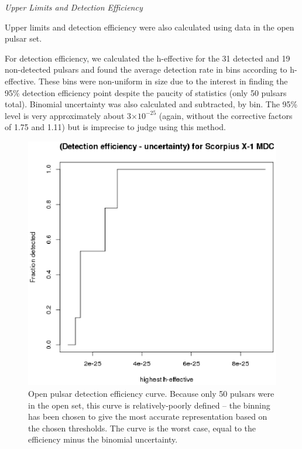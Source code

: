 \textit{Upper Limits and Detection Efficiency}

Upper limits and detection efficiency were also calculated using data in the open pulsar set.

For detection efficiency, we calculated the h-effective for the 31 detected and 19 non-detected pulsars and found the average detection rate in bins according to h-effective. These bins were non-uniform in size due to the interest in finding the 95\% detection efficiency point despite the paucity of statistics (only 50 pulsars total). Binomial uncertainty was also calculated and subtracted, by bin. The 95\% level is very approximately about 3$\times 10^{-25}$ (again, without the corrective factors of 1.75 and 1.11) but is imprecise to judge using this method.

\begin{figure}
\begin{center}
\includegraphics[width=0.3\paperwidth,height=0.2\paperheight]{detectionVsHeffective.eps}
\caption{ Open pulsar detection efficiency curve.
Because only 50 pulsars were in the open set, this curve is relatively-poorly defined -- the binning has been chosen to give the most accurate representation based on the chosen thresholds.
The curve is the worst case, equal to the efficiency minus the binomial uncertainty.
}
\end{center}
\end{figure}


